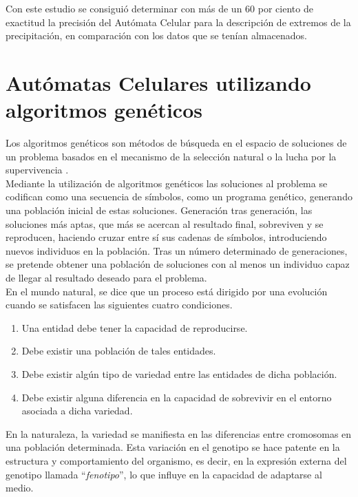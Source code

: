 Con este estudio se consiguió determinar con más de un 60 por ciento de exactitud la precisión del Autómata Celular para la descripción de extremos de la precipitación, en comparación con los datos que se tenían almacenados.

\section{Autómatas Celulares utilizando algoritmos genéticos}
Los algoritmos genéticos  son métodos de búsqueda en el espacio de soluciones de un problema basados en el mecanismo de la selección natural o la lucha por la supervivencia \cite{koza}. \\

Mediante la utilización de algoritmos genéticos las soluciones al problema se codifican como una secuencia de símbolos, como un programa genético, generando una población inicial de estas soluciones. Generación tras generación, las soluciones más aptas, que más se acercan al resultado final, sobreviven y se reproducen, haciendo cruzar entre sí sus cadenas de símbolos, introduciendo nuevos individuos en la población. Tras un número determinado de generaciones, se pretende obtener una población de soluciones con al menos un individuo capaz de llegar al resultado deseado para el problema.\\

En el mundo natural, se dice que un proceso está dirigido por una evolución cuando se satisfacen las siguientes cuatro condiciones.\\
\begin{enumerate}
\item Una entidad debe tener la capacidad de reproducirse.
\item Debe existir una población de tales entidades.
\item Debe existir algún tipo de variedad entre las entidades de dicha población.
\item Debe existir alguna diferencia en la capacidad de sobrevivir en el entorno asociada a dicha variedad.
\end{enumerate}

En la naturaleza, la variedad se manifiesta en las diferencias entre cromosomas en una población determinada. Esta variación en el genotipo se hace patente en la estructura y comportamiento del organismo, es decir, en la expresión externa del genotipo llamada ``\textit{fenotipo}'', lo que influye en la capacidad de adaptarse al medio.\\

